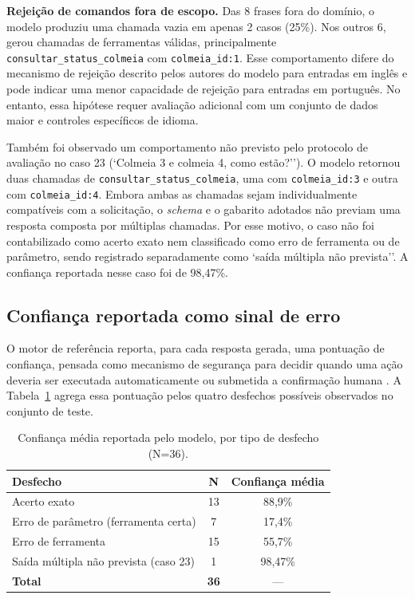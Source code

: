 \documentclass[12pt]{article}
\begin{document}
\textbf{Rejeição de comandos fora de escopo.} Das 8 frases fora do domínio, o modelo produziu uma chamada vazia em apenas 2 casos (25\%). Nos outros 6, gerou chamadas de ferramentas válidas, principalmente \texttt{consultar\_status\_colmeia} com \texttt{colmeia\_id:1}. Esse comportamento difere do mecanismo de rejeição descrito pelos autores do modelo para entradas em inglês \cite{ndubuaku2026controlled} e pode indicar uma menor capacidade de rejeição para entradas em português. No entanto, essa hipótese requer avaliação adicional com um conjunto de dados maior e controles específicos de idioma.

Também foi observado um comportamento não previsto pelo protocolo de
avaliação no caso 23 (`Colmeia 3 e colmeia 4, como estão?''). O modelo
retornou duas chamadas de \texttt{consultar\_status\_colmeia}, uma com
\texttt{colmeia\_id:3} e outra com \texttt{colmeia\_id:4}. Embora ambas
as chamadas sejam individualmente compatíveis com a solicitação, o
\textit{schema} e o gabarito adotados não previam uma resposta composta
por múltiplas chamadas. Por esse motivo, o caso não foi contabilizado
como acerto exato nem classificado como erro de ferramenta ou de
parâmetro, sendo registrado separadamente como `saída múltipla não
prevista''. A confiança reportada nesse caso foi de 98,47\%.


\subsection{Confiança reportada como sinal de erro}
\label{sec:confianca}

O motor de referência reporta, para cada resposta gerada, uma pontuação de
confiança, pensada como mecanismo de segurança para decidir quando uma
ação deveria ser executada automaticamente ou submetida a confirmação
humana \cite{ndubuaku2026controlled}. A Tabela~\ref{tab:confianca} agrega
essa pontuação pelos quatro desfechos possíveis observados no conjunto de
teste.

\begin{table}[h]
\centering
\caption{Confiança média reportada pelo modelo, por tipo de desfecho (N=36).}
\label{tab:confianca}
\begin{tabular}{lcc}
\toprule
Desfecho & N & Confiança média \\
\midrule
Acerto exato                          & 13 & 88,9\% \\
Erro de parâmetro (ferramenta certa)  & 7  & 17,4\% \\
Erro de ferramenta                    & 15 & 55,7\% \\
Saída múltipla não prevista (caso 23) & 1  & 98,47\% \\
\midrule
\textbf{Total}                        & \textbf{36} & --- \\
\bottomrule
\end{tabular}
\end{table}
\end{document}

